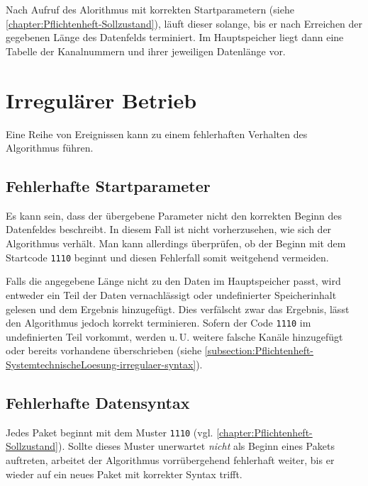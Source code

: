 Nach Aufruf des Alorithmus mit korrekten Startparametern (siehe \autoref{chapter:Pflichtenheft-Sollzustand}), läuft dieser solange, bis er nach Erreichen der gegebenen Länge des Datenfelds terminiert. Im Hauptspeicher liegt dann eine Tabelle der Kanalnummern und ihrer jeweiligen Datenlänge vor.


\section{Irregulärer Betrieb}
\label{section:Pflichtenheft-SystemtechnischeLoesung-irregulaer}

Eine Reihe von Ereignissen kann zu einem fehlerhaften Verhalten des Algorithmus führen.

\subsection{Fehlerhafte Startparameter}
\label{subsection:Pflichtenheft-SystemtechnischeLoesung-irregulaer-startparameter}

Es kann sein, dass der übergebene Parameter nicht den korrekten Beginn des Datenfeldes beschreibt. In diesem Fall ist nicht vorherzusehen, wie sich der Algorithmus verhält. Man kann allerdings überprüfen, ob der Beginn mit dem Startcode \texttt{1110} beginnt und diesen Fehlerfall somit weitgehend vermeiden.

Falls die angegebene Länge nicht zu den Daten im Hauptspeicher passt, wird entweder ein Teil der Daten vernachlässigt oder undefinierter Speicherinhalt gelesen und dem Ergebnis hinzugefügt. Dies verfälscht zwar das Ergebnis, lässt den Algorithmus jedoch korrekt terminieren. Sofern der Code \texttt{1110} im undefinierten Teil vorkommt, werden u.\,U. weitere falsche Kanäle hinzugefügt oder bereits vorhandene überschrieben (siehe \autoref{subsection:Pflichtenheft-SystemtechnischeLoesung-irregulaer-syntax}).

\subsection{Fehlerhafte Datensyntax}
\label{subsection:Pflichtenheft-SystemtechnischeLoesung-irregulaer-syntax}

Jedes Paket beginnt mit dem Muster \texttt{1110} (vgl. \autoref{chapter:Pflichtenheft-Sollzustand}). Sollte dieses Muster unerwartet \emph{nicht} als Beginn eines Pakets auftreten, arbeitet der Algorithmus vorrübergehend fehlerhaft weiter, bis er wieder auf ein neues Paket mit korrekter Syntax trifft.

